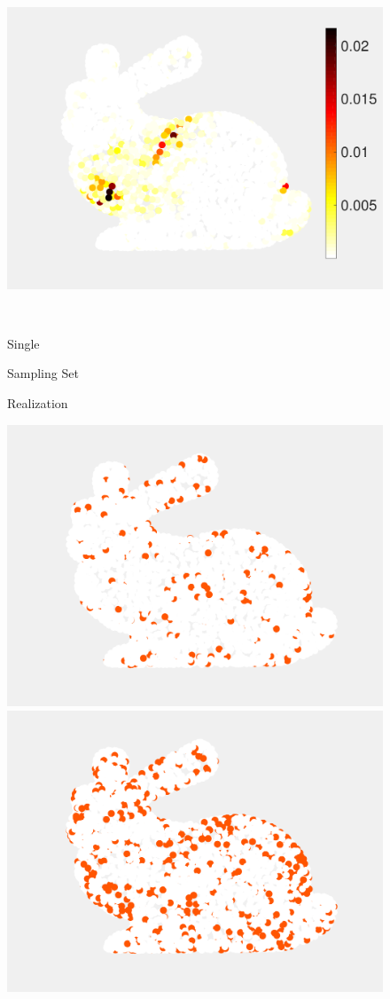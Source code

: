 \documentclass[journal, 10pt]{IEEEtran}
\begin{document}
{\begin{figure}[H]
\begin{minipage}[m]{0.4\linewidth}
\end{minipage}
\begin{minipage}[m]{0.4\linewidth}
\centerline{\includegraphics[width=.85\linewidth]{fig_rec_band_weights_adapted}}
\end{minipage} \\
\begin{minipage}[m]{0.16\linewidth}
\centerline{\small{Single}}
\centerline{\small{Sampling Set}}
\centerline{\small{Realization}}
\end{minipage}
\begin{minipage}[m]{0.4\linewidth}
\centerline{\includegraphics[width=.85\linewidth]{fig_rec_low_selected}}
\end{minipage}
\begin{minipage}[m]{0.4\linewidth}
\centerline{\includegraphics[width=.85\linewidth]{fig_rec_band_selected}}

\end{minipage}
\end{figure}}
\end{document}
